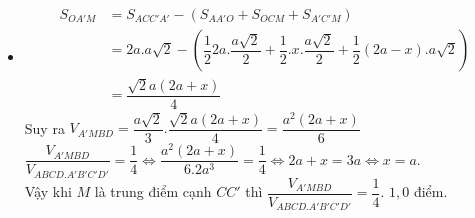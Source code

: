 \begin{bt}
{\begin{enumerate}
\begin{itemize}
	\item 
	\begin{align*}
	S_{OA'M}&=S_{ACC'A'}-\left(S_{AA'O}+S_{OCM}+S_{A'C'M}\right)\\ &=2a.a\sqrt{2}-\left(\dfrac{1}{2}2a.\dfrac{a\sqrt{2}}{2}+\dfrac{1}{2}.x.\dfrac{a\sqrt{2}}{2}+\dfrac{1}{2}(2a-x).a\sqrt{2}\right)\\&=\dfrac{\sqrt{2}a(2a+x)}{4}
	\end{align*}
	Suy ra $V_{A'MBD}=\dfrac{a\sqrt{2}}{3}.\dfrac{\sqrt{2}a(2a+x)}{4}=\dfrac{a^2(2a+x)}{6}$\\
	$\dfrac{V_{A'MBD}}{V_{ABCD.A'B'C'D'}}=\dfrac{1}{4}\Leftrightarrow \dfrac{a^2(2a+x)}{6.2a^3}=\dfrac{1}{4}\Leftrightarrow 2a+x=3a\Leftrightarrow x=a$.\\
Vậy khi $M$ là trung điểm cạnh $CC'$ thì  $\dfrac{V_{A'MBD}}{V_{ABCD.A'B'C'D'}}=\dfrac{1}{4}$. \dotfill $1{,}0$ điểm.
	\end{itemize}
\end{enumerate}
	}
\end{bt}
